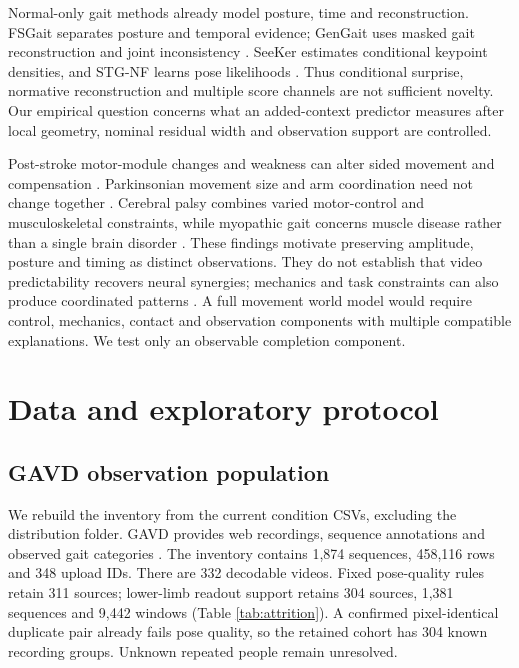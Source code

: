 \documentclass[letterpaper]{article}
\begin{document}
Normal-only gait methods already model posture, time and reconstruction. FSGait separates posture and temporal evidence; GenGait uses masked gait reconstruction and joint inconsistency \citep{duan2024fsgait, motta2026gengait}. SeeKer estimates conditional keypoint densities, and STG-NF learns pose likelihoods \citep{delic2025seeker, hirschorn2023stgnf}. Thus conditional surprise, normative reconstruction and multiple score channels are not sufficient novelty. Our empirical question concerns what an added-context predictor measures after local geometry, nominal residual width and observation support are controlled.

Post-stroke motor-module changes and weakness can alter sided movement and compensation \citep{clark2010modules, awad2020drive}. Parkinsonian movement size and arm coordination need not change together \citep{morris1994hypokinesia, sterling2015armswing}. Cerebral palsy combines varied motor-control and musculoskeletal constraints, while myopathic gait concerns muscle disease rather than a single brain disorder \citep{steele2015synergies, steele2012crouch, vandekerckhove2025dmd}. These findings motivate preserving amplitude, posture and timing as distinct observations. They do not establish that video predictability recovers neural synergies; mechanics and task constraints can also produce coordinated patterns \citep{kutch2012synergies}. A full movement world model would require control, mechanics, contact and observation components with multiple compatible explanations. We test only an observable completion component.

\section{Data and exploratory protocol}

\subsection{GAVD observation population}

We rebuild the inventory from the current condition CSVs, excluding the distribution folder. GAVD provides web recordings, sequence annotations and observed gait categories \citep{ranjan2025gavd, gavd2026catalog}. The inventory contains 1,874 sequences, 458,116 rows and 348 upload IDs. There are 332 decodable videos. Fixed pose-quality rules retain 311 sources; lower-limb readout support retains 304 sources, 1,381 sequences and 9,442 windows (Table \ref{tab:attrition}). A confirmed pixel-identical duplicate pair already fails pose quality, so the retained cohort has 304 known recording groups. Unknown repeated people remain unresolved.
\end{document}
